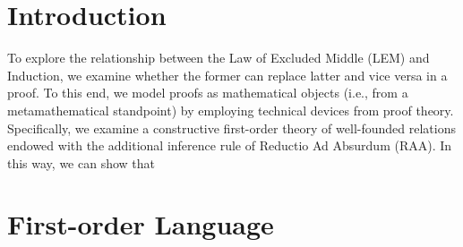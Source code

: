 \message{ !name(wftheory.tex)}\documentclass{article}
\begin{document}


\section{Introduction}

To explore the relationship between the Law of
Excluded Middle (LEM) and Induction, we examine whether the former can
replace latter and vice versa in a proof. To this end, we model proofs
as mathematical objects (i.e., from a metamathematical standpoint) by
employing technical devices from proof theory. Specifically, we
examine a constructive first-order theory of well-founded relations
endowed with the additional inference rule of Reductio Ad Absurdum
(RAA). In this way, we can show that 

\section{First-order Language}
\end{document}
